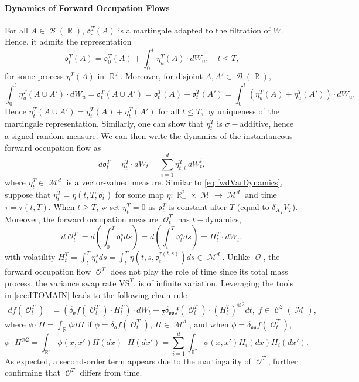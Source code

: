 \documentclass[11pt]{article}
\def\mo{\mathfrak{o}}
\theoremstyle{plain}
\theoremstyle{definition}
\DeclareMathOperator{\R}{\mathbb{R}}
\DeclareMathOperator{\calB}{\mathcal{B}}
\DeclareMathOperator{\calC}{\mathcal{C}}
\DeclareMathOperator{\calM}{\mathcal{M}}
\DeclareMathOperator{\calO}{\mathcal{O}}
\begin{document}
\paragraph{Dynamics of  Forward Occupation Flows}
For all $A\in \calB(\R)$,  $\mo^T_{\cdot}(A)$ is a martingale  adapted to the filtration of $W$. Hence, it admits the  representation
\begin{equation}\label{eq:martingale}
\mo_t^T(A) = \mo_0^T(A) + \int_0^t \eta^T_u(A)\cdot dW_u, \quad t\le T, 
\end{equation}
for some  process $\eta^T_{\cdot}(A)$ in $\R^d$. 
Moreover, for  disjoint $A,A' \in \calB(\R)$, 
$$\int_0^t \eta^T_u(A\cup A')\cdot dW_u = \mo_t^T(A \cup A') 
= \mo_t^T(A) + \mo_t^T(A') = \int_0^t (\eta^T_u(A) + \eta^T_u(A'))\cdot dW_u .$$
Hence $\eta^T_t(A\cup A') = \eta^T_t(A) + \eta^T_t(A')$ for all $ t\le T$, by   uniqueness of the martingale representation. Similarly, one can show that $\eta^T_t$ is $\sigma-$additive, hence a signed random measure. We can then write the dynamics of the instantaneous forward occupation flow as 
\begin{equation}\label{eq:omartingale}
    d\mo_t^T = \eta^T_t \cdot dW_t = \sum_{i=1}^d\eta^T_{t,i} \ dW_t^i,
\end{equation}
where $\eta^T_t \in \calM^d$ is a vector-valued measure.   
Similar to  \eqref{eq:fwdVarDynamics}, suppose  that $\eta_t^T = \eta(t,T,\mo_t^{\tau})$ 
for some map $\eta:\R_{+}^2\times \calM \to \calM^d$ 
and time $\tau = \tau(t,T)$. When $t \ge T$, w set $\eta_t^T = 0$ as $\mo_t^T$ is constant after $T$ (equal to $\delta_{X_T}V_T$).  
Moreover,  the forward occupation measure $\calO_t^T $ has $t-$dynamics, 
$$d\calO_t^T = d\left(\int_0^T \mo_t^{s} ds\right) = d\left(\int_t^T \mo_t^{s} ds\right)  = H_t^T \cdot dW_t,   $$
with volatility $H_t^T = \int_t^T\eta_t^sds = \int_t^T\eta(t,s,\mo_t^{\tau(t,s)})ds \in \calM^d$. Unlike $\calO$, the forward occupation flow $\calO^T$ does not play the role of time since its total mass process, the  variance swap rate $\text{VS}^T$, is 
of infinite variation. Leveraging the tools in \cref{sec:ITOMAIN} leads to the following  chain rule 
\begin{align}\label{eq:fwdChain}
   df(\calO^T_t) &=   (\delta_{\mo}f(\calO_t^T)\cdot H_t^T)\cdot dW_t +  \frac{1}{2} \delta_{\mo\mo}f(\calO_t^T)\cdot (H_t^T)^{\otimes 2}dt, \; f\in \calC^2(\calM), 
\end{align}
where $\phi\cdot H = \int_{\R}\phi dH$ if $\phi = \delta_{\mo}f(\calO_t^T)$, $H \in \calM^d$,  and  when  $\phi = \delta_{\mo\mo}f(\calO_t^T)$, 
$$\phi\cdot H^{\otimes 2} = \int_{\R^2}\phi(x,x')H(dx)\cdot H(dx') = \sum_{i=1}^d \int_{\R^2}\phi(x,x')H_i(dx) H_i(dx'). $$ As expected, a second-order term appears due to the martingality of $\calO^T$, further  confirming that $\calO^T$ differs from time. 
\end{document}
